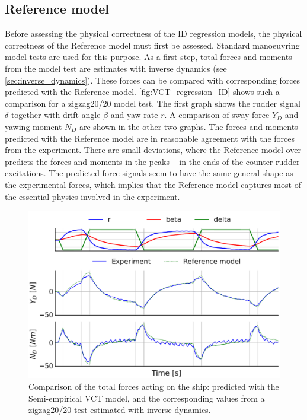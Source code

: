 \subsection{Reference model}
\label{sec:result_VCT_regression}
Before assessing the physical correctness of the ID regression models, the physical correctness of the Reference model must first be assessed. Standard manoeuvring model tests are used for this purpose. As a first step, total forces and moments from the model test are estimates with inverse dynamics (see \autoref{sec:inverse_dynamics}). These forces can be compared with corresponding forces predicted with the Reference model. 
\autoref{fig:VCT_regression_ID} shows such a comparison for a zigzag20/20 model test. The first graph shows the rudder signal $\delta$ together with drift angle $\beta$ and yaw rate $r$. A comparison of sway force $Y_D$ and yawing moment $N_D$ are shown in the other two graphs. The forces and moments predicted with the Reference model are in reasonable agreement with the forces from the experiment. There are small deviations, where the Reference model over predicts the forces and moments in the peaks -- in the ends of the counter rudder excitations. The predicted force signals seem to have the same general shape as the experimental forces, which implies that the Reference model captures most of the essential physics involved in the experiment. 
\begin{figure}[h!]
    \includegraphics[width=\columnwidth]{figures/result_VCT_regression.VCT_regression_ID.pdf}
    \caption{Comparison of the total forces acting on the ship: predicted with the Semi-empirical VCT model, and the corresponding values from a zigzag20/20 test estimated with inverse dynamics.}
    \label{fig:VCT_regression_ID}
\end{figure}

